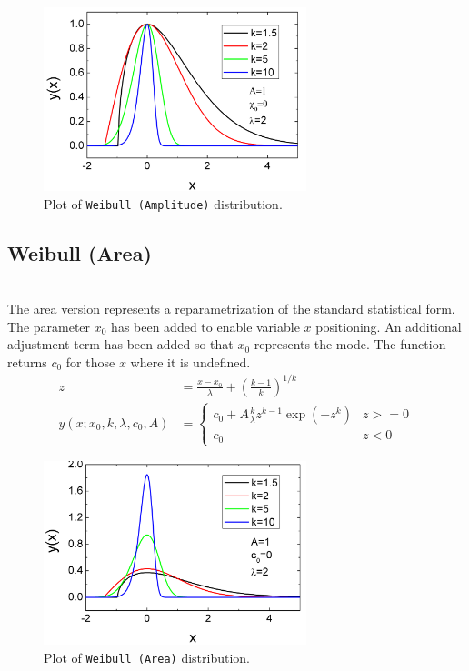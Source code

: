 \begin{figure}[htb]
\begin{center}
\includegraphics[width=0.6824\textwidth]{WeibullAmplitude.png}
\end{center}
\caption{Plot of \texttt{Weibull (Amplitude)} distribution.}
\label{fig:WeibullAmplitude}
\end{figure}
\clearpage

\subsection{Weibull (Area)} ~\\
\label{sec:WeibullArea}
The area version represents a reparametrization of the standard statistical
form. The parameter $x_0$ has been added to enable variable $x$ positioning. An
additional adjustment term has been added so that $x_0$ represents the mode.
The function returns $c_0$ for those $x$ where it is undefined.
\begin{align}
z & = \frac{x-x_0}{\lambda}+\left(\frac{k-1}{k}\right)^{1/k}  \nonumber \\
y(x;x_0,k,\lambda,c_0,A) &=
    \begin{cases}
        c_0 + A\frac{k}{\lambda} z^{k-1} \exp\left(-z^k\right) & z >= 0 \\
        c_0 & z<0
    \end{cases}
\end{align}

\begin{figure}[htb]
\begin{center}
\includegraphics[width=0.6824\textwidth]{WeibullArea.png}
\end{center}
\caption{Plot of \texttt{Weibull (Area)} distribution.}
\label{fig:WeibullArea}
\end{figure}
